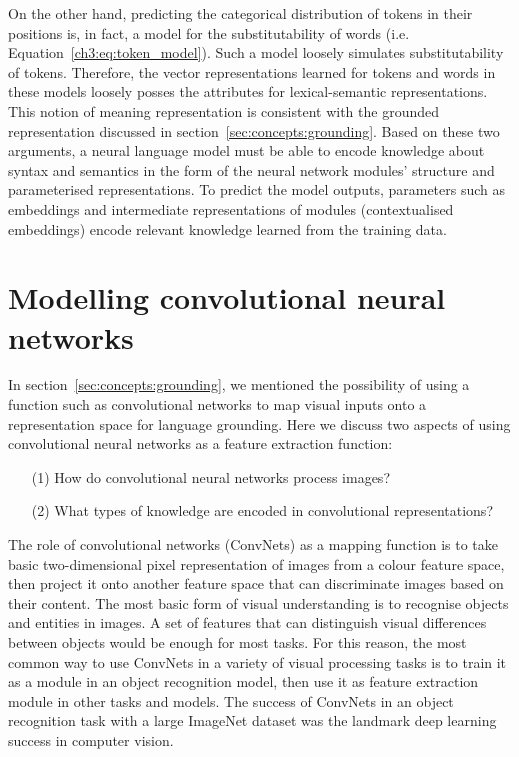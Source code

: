 On the other hand, predicting the categorical distribution of tokens in their positions is, in fact, a model for the substitutability of words (i.e. Equation~\ref{ch3:eq:token_model}). 
Such a model loosely simulates substitutability of tokens.
Therefore, the vector representations learned for tokens and words in these models loosely posses the attributes for lexical-semantic representations.
This notion of meaning representation is consistent with the grounded representation discussed in section~\ref{sec:concepts:grounding}.
Based on these two arguments, a neural language model must be able to encode knowledge about syntax and semantics in the form of the neural network modules’ structure and parameterised representations. 
To predict the model outputs, parameters such as embeddings and intermediate representations of modules (contextualised embeddings) encode relevant knowledge learned from the training data.


\section{Modelling convolutional neural networks}\label{sec:concepts:convnets}
In section~\ref{sec:concepts:grounding}, we mentioned the possibility of using a function such as convolutional networks to map visual inputs onto a representation space for language grounding.
Here we discuss two aspects of using convolutional neural networks as a feature extraction function:
\begin{itemize}
	\item[(1)] How do convolutional neural networks process images?%
	\item[(2)] What types of knowledge are encoded in convolutional representations?
\end{itemize}

The role of convolutional networks (ConvNets) as a mapping function is to take basic two-dimensional pixel representation of images from a colour feature space, then project it onto another feature space that can discriminate images based on their content.
The most basic form of visual understanding is to recognise objects and entities in images.
A set of features that can distinguish visual differences between objects would be enough for most tasks.
For this reason, the most common way to use ConvNets in a variety of visual processing tasks is to train it as a module in an object recognition model, then use it as feature extraction module in other tasks and models.
The success of ConvNets in an object recognition task \citep{krizhevsky2012imagenet} with a large ImageNet dataset  \citep{deng2009imagenet} was the landmark deep learning success in computer vision. 

